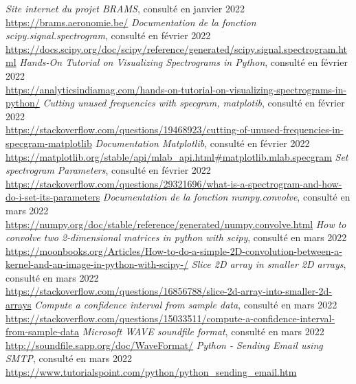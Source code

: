 \documentclass[11pt]{article}
\begin{document}
\begin{thebibliography}{100}
    \textit{Site internet du projet BRAMS}, consulté en janvier 2022\\\url{https://brams.aeronomie.be/}
    \textit{Documentation de la fonction scipy.signal.spectrogram}, consulté en février 2022\\\url{https://docs.scipy.org/doc/scipy/reference/generated/scipy.signal.spectrogram.html}
    \textit{Hands-On Tutorial on Visualizing Spectrograms in Python}, consulté en février 2022\\\url{https://analyticsindiamag.com/hands-on-tutorial-on-visualizing-spectrograms-in-python/}
    \textit{Cutting unused frequencies with specgram, matplotib}, consulté en février 2022\\\url{https://stackoverflow.com/questions/19468923/cutting-of-unused-frequencies-in-specgram-matplotlib}
    \textit{Documentation Matplotlib}, consulté en février 2022\\\url{https://matplotlib.org/stable/api/mlab_api.html#matplotlib.mlab.specgram}
    \textit{Set spectrogram Parameters}, consulté en février 2022\\\url{https://stackoverflow.com/questions/29321696/what-is-a-spectrogram-and-how-do-i-set-its-parameters}
    \textit{Documentation de la fonction numpy.convolve}, consulté en mars 2022\\\url{https://numpy.org/doc/stable/reference/generated/numpy.convolve.html}
    \textit{How to convolve two 2-dimensional matrices in python with scipy}, consulté en mars 2022\\\url{https://moonbooks.org/Articles/How-to-do-a-simple-2D-convolution-between-a-kernel-and-an-image-in-python-with-scipy-/}
    \textit{Slice 2D array in smaller 2D arrays}, consulté en mars 2022\\\url{https://stackoverflow.com/questions/16856788/slice-2d-array-into-smaller-2d-arrays}
    \textit{Compute a confidence interval from sample data}, consulté en mars 2022\\\url{https://stackoverflow.com/questions/15033511/compute-a-confidence-interval-from-sample-data}
    \textit{Microsoft WAVE soundfile format}, consulté en mars 2022\\\url{http://soundfile.sapp.org/doc/WaveFormat/}
    \textit{Python - Sending Email using SMTP}, consulté en mars 2022\\\url{https://www.tutorialspoint.com/python/python_sending_email.htm}

\end{thebibliography}
\end{document}
